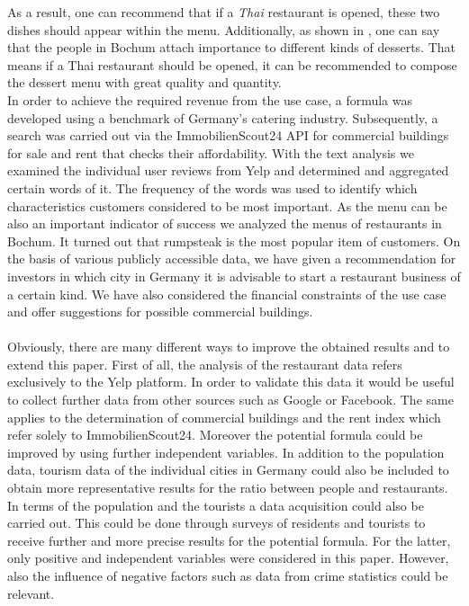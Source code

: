As a result, one can recommend that if a \textit{Thai} restaurant is opened, these two dishes should appear within the menu. Additionally, as shown in , one can say that the people in Bochum attach importance to different kinds of desserts. That means if a Thai restaurant should be opened, it can be recommended to compose the dessert menu with great quality and quantity.\\
In order to achieve the required revenue from the use case, a formula was developed using a benchmark of Germany's catering industry. Subsequently, a search was carried out via the ImmobilienScout24 \ac{API} for commercial buildings for sale and rent that checks their affordability.
With the text analysis we examined the individual user reviews from Yelp and determined and aggregated certain words of it. The frequency of the words was used to identify which characteristics customers considered to be most important.
As the menu can be also an important indicator of success we analyzed the menus of restaurants in Bochum. It turned out that rumpsteak is the most popular item of customers. \newline
On the basis of various publicly accessible data, we have given a recommendation for investors in which city in Germany it is advisable to start a restaurant business of a certain kind. We have also considered the financial constraints of the use case and offer suggestions for possible commercial buildings.\\
\\
Obviously, there are many different ways to improve the obtained results and to extend this paper. First of all, the analysis of the restaurant data refers exclusively to the Yelp platform. In order to validate this data it would be useful to collect further data from other sources such as Google or Facebook. The same applies to the determination of commercial buildings and the rent index which refer solely to ImmobilienScout24. \newline
Moreover the potential formula could be improved by using further independent variables. In addition to the population data, tourism data of the individual cities in Germany could also be included to obtain more representative results for the ratio between people and restaurants. In terms of the population and the tourists a data acquisition could also be carried out. This could be done through surveys of residents and tourists to receive further and more precise results for the potential formula. For the latter, only positive and independent variables were considered in this paper. However, also the influence of negative factors such as data from crime statistics could be relevant. \newline
